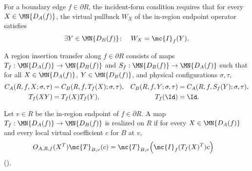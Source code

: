 \begin{definition}
    \label{def:peps_region_resonate_reconcile}
    \leanok
    For a boundary edge $f\in\partial R$, the incident-form condition requires that for every $X\in\MN{D_A(f)}$, the virtual pullback $W_X$ of the in-region endpoint operator satisfies
    \begin{align}
        \exists Y\in\MN{D_B(f)}\colon\quad W_X=\mc{I}_f(Y).
        \label{eq:peps_region_resonate_reconcile}
    \end{align}
\end{definition}

\begin{definition}
    \label{def:peps_region_insertion_transfer}
    \leanok
    A region insertion transfer along $f\in\partial R$ consists of maps $T_f:\MN{D_A(f)}\to\MN{D_B(f)}$ and $S_f:\MN{D_B(f)}\to\MN{D_A(f)}$ such that for all $X\in\MN{D_A(f)}$, $Y\in\MN{D_B(f)}$, and physical configurations $\sigma,\tau$,
    \begin{align}
        C_A(R,f,X;\sigma,\tau)
                 & =C_B(R,f,T_f(X);\sigma,\tau), &
        C_B(R,f,Y;\sigma,\tau)
                 & =C_A(R,f,S_f(Y);\sigma,\tau),
        \label{eq:peps_region_insertion_transfer}  \\
        T_f(XY)  & =T_f(X)T_f(Y),                &
        T_f(\Id) & =\Id.
        \notag
    \end{align}
\end{definition}

\begin{definition}
    \label{def:peps_region_transfer_realizes}
    \leanok
    Let $v\in R$ be the in-region endpoint of $f\in\partial R$. A map $T_f:\MN{D_A(f)}\to\MN{D_B(f)}$ is realized on $R$ if for every $X\in\MN{D_A(f)}$ and every local virtual coefficient $c$ for $B$ at $v$,
    \begin{align}
        O_{A,R,f}(X^T) \mc{T}_{B,v}(c)
         & =
        \mc{T}_{B,v}\!\left(\mc{I}_f(T_f(X)^T)c\right)
        \label{eq:peps_region_transfer_realizes}
    \end{align}
    (\cite[Section~3, lines~254--582]{Molnar2018NormalPEPS}).
\end{definition}

